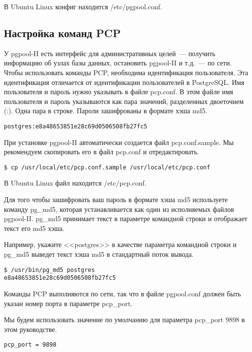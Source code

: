 В Ubuntu Linux конфиг находится /etc/pgpool.conf.

\subsection{Настройка команд PCP}
У pgpool-II есть интерфейс для административных целей~--- получить информацию об узлах базы данных,
остановить pgpool-II и т.д.~--- по сети. Чтобы использовать команды PCP, необходима идентификация пользователя.
Эта идентификация отличается от идентификации пользователей в PostgreSQL. Имя пользователя и пароль нужно указывать в
файле pcp.conf. В этом файле имя пользователя и пароль указываются как пара значений, разделенных двоеточием (:).
Одна пара в строке. Пароли зашифрованы в формате хэша md5.
\begin{lstlisting}[label=lst:pgpool6,caption=Настройка команд PCP]
postgres:e8a48653851e28c69d0506508fb27fc5
\end{lstlisting}

При установке pgpool-II автоматически создается файл pcp.conf.sample.
Мы рекомендуем скопировать его в файл pcp.conf и отредактировать.
\begin{lstlisting}[label=lst:pgpool7,caption=Настройка команд PCP]
$ cp /usr/local/etc/pcp.conf.sample /usr/local/etc/pcp.conf
\end{lstlisting}

В Ubuntu Linux файл находится /etc/pcp.conf.

Для того чтобы зашифровать ваш пароль в формате хэша md5 используете команду pg\_md5, которая устанавливается как один из
исполняемых файлов pgpool-II. pg\_md5 принимает текст в параметре командной строки и отображает текст его md5 хэша.

Например, укажите <<postgres>> в качестве параметра командной строки и pg\_md5 выведет текст хэша md5 в стандартный поток вывода.
\begin{lstlisting}[label=lst:pgpool8,caption=Настройка команд PCP]
$ /usr/bin/pg_md5 postgres
e8a48653851e28c69d0506508fb27fc5
\end{lstlisting}

Команды PCP выполняются по сети, так что в файле pgpool.conf должен быть указан номер порта в параметре pcp\_port.

Мы будем использовать значение по умолчанию для параметра pcp\_port 9898 в этом руководстве.
\begin{lstlisting}[label=lst:pgpool9,caption=Настройка команд PCP]
pcp_port = 9898
\end{lstlisting}


